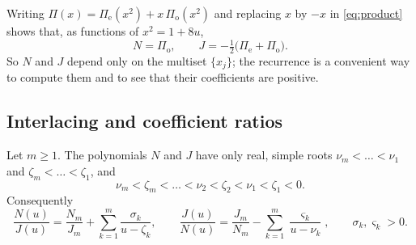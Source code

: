 Writing \(\Pi(x)=\Pi_{\mathrm e}(x^2)+x\,\Pi_{\mathrm o}(x^2)\) and replacing \(x\) by \(-x\) in
\eqref{eq:product} shows that, as functions of \(x^2=1+8u\),
\begin{equation}\label{eq:evenodd}
 N=\Pi_{\mathrm o},\qquad J=-\tfrac12\bigl(\Pi_{\mathrm e}+\Pi_{\mathrm o}\bigr).
\end{equation}
So \(N\) and \(J\) depend only on the multiset \(\{x_j\}\); the recurrence is a convenient way
to compute them and to see that their coefficients are positive.

\subsection{Interlacing and coefficient ratios}
\begin{lemma}[Interlacing]\label{lem:interlace}
Let \(m\ge1\). The polynomials \(N\) and \(J\) have only real, simple roots
\(\nu_m<\dots<\nu_1\) and \(\zeta_m<\dots<\zeta_1\), and
\begin{equation}\label{eq:interlace}
 \nu_m<\zeta_m<\dots<\nu_2<\zeta_2<\nu_1<\zeta_1<0 .
\end{equation}
Consequently
\begin{equation}\label{eq:pf}
 \frac{N(u)}{J(u)}=\frac{N_m}{J_m}+\sum_{k=1}^m\frac{\sigma_k}{u-\zeta_k},\qquad
 \frac{J(u)}{N(u)}=\frac{J_m}{N_m}-\sum_{k=1}^m\frac{\varsigma_k}{u-\nu_k},\qquad
 \sigma_k,\varsigma_k>0 .
\end{equation}
\end{lemma}
